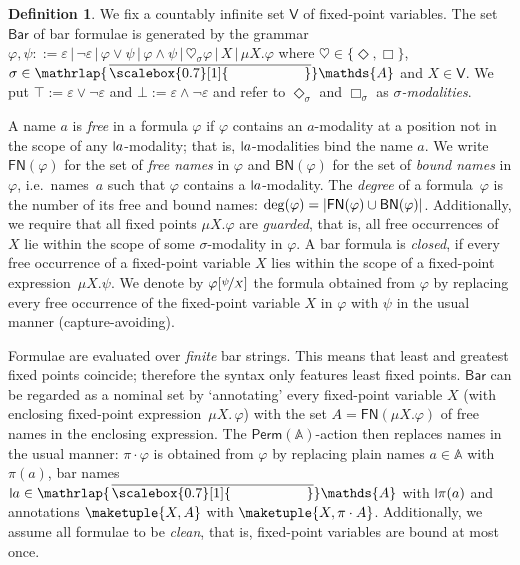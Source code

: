 \documentclass[10pt,a4paper]{amsart}
\theoremstyle{definition}
\newtheorem{defn}[theo]{Definition}
\newcommand{\At}{\mathds{A}}
\newcommand{\card}[1]{\left\vert#1\right\vert}
\newcommand{\Perm}{\mathsf{Perm}}
\newcommand{\names}{\At}
\renewcommand{\phi}{\varphi}
\newcommand{\set}[1]{\{#1\}}
\newcommand{\mybar}[3]{%
  \mathrlap{\hspace{#2}\overline{\scalebox{#1}[1]{\phantom{\ensuremath{#3}}}}}\ensuremath{#3}
}
\newcommand{\FN}{\mathsf{FN}}
\newcommand{\BN}{\mathsf{BN}}
\newcommand{\VAR}{\mathsf{V}}
\newcommand{\BarForm}{\mathsf{Bar}}
\newcommand{\barNames}{{\mybar{0.7}{1.25pt}{\names}}}
\newcommand{\midmid}{\hspace{0.2ex}{\rule[-0.1ex]{0.6pt}{1.65ex}}\hspace{0.2ex}}
\newcommand{\newletter}[1]{{\midmid}#1}
\let\originalleft\left
\let\originalright\right
\renewcommand{\left}{\mathopen{}\mathclose\bgroup\originalleft}
\renewcommand{\right}{\aftergroup\egroup\originalright}
\renewcommand{\enquote}[1]{`#1'}
\begin{document}
\begin{defn}%
  We fix a countably infinite set $\VAR$ of fixed-point variables. The set $\BarForm$ of bar formulae
  is generated by the grammar $\varphi, \psi ::= \varepsilon\,\vert\,\neg\varepsilon\,\vert\,\varphi\vee\psi
  \,\vert\,\varphi\wedge\psi\,\vert\,\heartsuit_\sigma \varphi\,\vert\,X\,\vert\,\mu X.\varphi$ where
  $\heartsuit \in \set{\Diamond, \Box}$, $\sigma \in \barNames$ and $X \in \VAR$. We put
  $\top := \varepsilon \vee \neg\varepsilon$ and $\bot := \varepsilon \wedge \neg\varepsilon$ and
  refer to $\Diamond_\sigma$ and $\Box_\sigma$ as \emph{$\sigma$-modalities}.

  A name $a$ is \emph{free} in a formula $\varphi$ if $\varphi$ contains an $a$-modality at a position
  not in the scope of any $\newletter{a}$-modality; that is, $\newletter{a}$-modalities bind the name $a$.
  We write $\FN(\varphi)$ for the set of \emph{free names} in $\varphi$ and $\BN(\varphi)$ for
  the set of \emph{bound names} in $\varphi$, i.e.~names~$a$ such that $\varphi$ contains a $\newletter{a}$-modality.
  The \emph{degree} of a formula~$\varphi$ is the number of its free and bound names: $\deg(\varphi) = \card{\FN(\varphi) \cup \BN(\varphi)}$.
  Additionally, we require that all fixed points $\mu X. \varphi$ are \emph{guarded}, that is, all free occurrences of~$X$ lie within the scope of some $\sigma$-modality in $\varphi$.
  A bar formula is \emph{closed}, if every free occurrence of a fixed-point variable $X$ lies within the
  scope of a fixed-point expression~$\mu X. \psi$. We denote by $\phi[\nicefrac{\psi}{X}]$ the
  formula obtained from $\phi$ by replacing every free occurrence of the fixed-point variable $X$ in $\phi$ with $\psi$
  in the usual manner (capture-avoiding).
\end{defn}

Formulae are evaluated over \emph{finite} bar strings. This means that least and greatest fixed points coincide; therefore the syntax only features least fixed points.
$\BarForm$ can be regarded as a nominal set by \enquote{annotating} every fixed-point variable $X$
(with enclosing fixed-point expression~$\mu X.\, \varphi$) with the set $A = \FN(\mu X. \varphi)$ of free names
in the enclosing expression. The $\Perm(\names)$-action then replaces names in the usual manner:
$\pi \cdot \varphi$ is obtained from $\varphi$ by replacing plain names $a \in \names$ with
$\pi(a)$, bar names $\newletter{a} \in \barNames$ with $\newletter{\pi(a)}$ and annotations
$\maketuple{X, A}$ with $\maketuple{X, \pi \cdot A}$. Additionally, we assume all formulae
to be \emph{clean}, that is, fixed-point variables are bound at most once.
\end{document}
